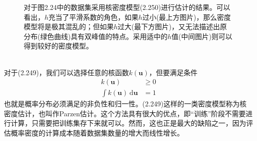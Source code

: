 \documentclass[b5paper]{book}
\numberwithin{equation}{chapter}
\newcommand {\rmd} {\mathrm{d}}
\begin{document}
{\begin{figure}[ht]
		\caption{对于图2.24中的数据集采用核密度模型(2.250)进行估计的结果。可以看出，$h$充当了平滑系数的角色，如果$h$过小(最上方图片)，那么密度模型将是极其混乱的；但如果$h$过大(最下方图片)，又无法描述出原分布(绿色曲线)具有双峰值的特点。采用适中的$h$值(中间图片)则可以得到较好的密度模型。}
		\label{fig:2-25}
	\end{figure}
	\\
	\indent 对于(2.249)，我们可以选择任意的核函数$k(\mathbf{u})$，但要满足条件
	\begin{align}
		k(\mathbf{u}) &\geqslant 0 \\
		\int k(\mathbf{u})\ \rmd \mathbf{u} &= 1
	\end{align}
	也就是概率分布必须满足的非负性和归一性。(2.249)这样的一类密度模型称为核密度估计，也叫作Parzen估计。这个方法具有很大的优点，即“训练”阶段不需要进行计算，只需要把训练集存下来就可以。然而，这也正是最大的缺陷之一，因为评估概率密度的计算成本随着数据集数量的增大而线性增长。
	}
\end{document}
